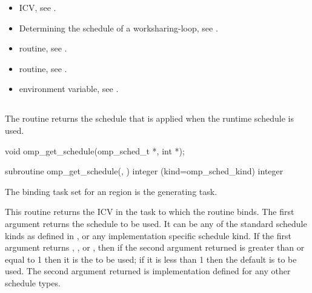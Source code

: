 \crossreferences
\begin{itemize}
\item {} ICV, see
.

\item Determining the schedule of a worksharing-loop, see
.

\item {} routine, see
.

\item {} routine, see
.

\item {} environment variable, see
.
\end{itemize}



\subsection{}
\label{subsec:omp_get_schedule}
\summary
The  routine returns the schedule that is 
applied when the runtime schedule is used.

\format
\begin{ccppspecific}
\begin{ompcFunction}
void omp_get_schedule(omp_sched_t *, int *);
\end{ompcFunction}
\end{ccppspecific}


\begin{fortranspecific}
\begin{ompfSubroutine}
subroutine omp_get_schedule(, )
integer (kind=omp_sched_kind) 
integer 
\end{ompfSubroutine}
\end{fortranspecific}

\binding
The binding task set for an  region is the generating task.

\effect
This routine returns the  ICV in the task to which 
the routine binds. The first argument  returns the schedule 
to be used. It can be any of the standard schedule kinds as defined in
, or any implementation specific
schedule kind. If the first argument returns , , 
or , then if the second argument  returned 
is greater than or equal to 1 then it is the  to be used; 
if it is less than 1 then the default  is to be used. The 
second argument  returned is implementation defined for 
any other schedule types.

